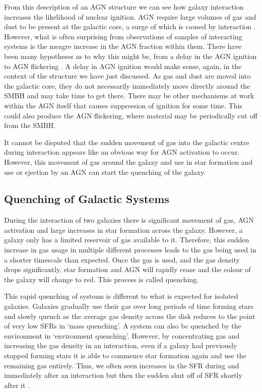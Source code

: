 From this description of an AGN structure we can see how galaxy interaction increases the likelihood of nuclear ignition. AGN require large volumes of gas and dust to be present at the galactic core, a surge of which is caused by interaction \citep[][provides an excellent summary of this process from the point of view of simulations]{2008ApJS..175..356H}. However, what is often surprising from observations of samples of interacting systems is the meagre increase in the AGN fraction within them. There have been many hypotheses as to why this might be, from a delay in the AGN ignition \citep{2011MNRAS.418.2043E} to AGN flickering \citep{2015MNRAS.451.2517S}. A delay in AGN ignition would make sense, again, in the context of the structure we have just discussed. As gas and dust are moved into the galactic core, they do not necessarily immediately move directly around the SMBH and may take time to get there. There may be other mechanisms at work within the AGN itself that causes suppression of ignition for some time. This could also produce the AGN flickering, where material may be periodically cut off from the SMBH.

It cannot be disputed that the sudden movement of gas into the galactic centre during interaction appears like an obvious way for AGN activation to occur. However, this movement of gas around the galaxy and use in star formation and use or ejection by an AGN can start the quenching of the galaxy. 

\subsection{Quenching of Galactic Systems}
\noindent During the interaction of two galaxies there is significant movement of gas, AGN activation and large increases in star formation across the galaxy. However, a galaxy only has a limited reservoir of gas available to it. Therefore, this sudden increase in gas usage in multiple different processes leads to the gas being used in a shorter timescale than expected. Once the gas is used, and the gas density drops significantly, star formation and AGN will rapidly cease and the colour of the galaxy will change to red. This process is called quenching.

This rapid quenching of systems is different to what is expected for isolated galaxies. Galaxies gradually use their gas over long periods of time forming stars and slowly quench as the average gas density across the disk reduces to the point of very low SFRs \citep{2010ApJ...721..193P} in `mass quenching'. A system can also be quenched by the environment in `environment quenching'. However, by concentrating gas and increasing the gas density in an interaction, even if a galaxy had previously stopped forming stars it is able to commence star formation again and use the remaining gas entirely. Thus, we often seen increases in the SFR during and immediately after an interaction but then the sudden shut off of SFR shortly after it \citep{2022MNRAS.517L..92E}. 

